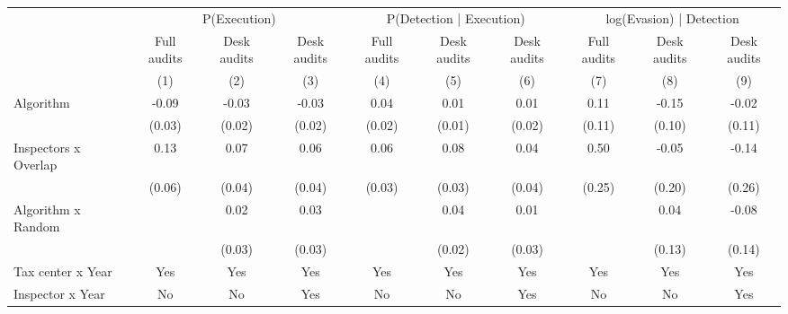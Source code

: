\begin{tabular}{lccc|ccc|ccc} \toprule
\multicolumn{1}{l}{} & \multicolumn{3}{c}{P(Execution)} & \multicolumn{3}{c}{P(Detection | Execution)} & \multicolumn{3}{c}{log(Evasion) | Detection} \\\cmidrule(lr){2-4}\cmidrule(lr){5-7}\cmidrule(lr){8-10} \multicolumn{1}{l}{} & Full audits & Desk audits & Desk audits & Full audits & Desk audits & Desk audits & Full audits & Desk audits & Desk audits \\ \multicolumn{1}{l}{} & (1) & (2) & (3) & (4) & (5) & (6) & (7) & (8) & (9) \\ \midrule
Algorithm   &       -0.09\sym{***}&       -0.03\sym{*}  &       -0.03\sym{*}  &        0.04\sym{**} &        0.01         &        0.01         &        0.11         &       -0.15         &       -0.02         \\
            &      (0.03)         &      (0.02)         &      (0.02)         &      (0.02)         &      (0.01)         &      (0.02)         &      (0.11)         &      (0.10)         &      (0.11)         \\
\addlinespace
Inspectors x Overlap&        0.13\sym{**} &        0.07\sym{*}  &        0.06         &        0.06\sym{*}  &        0.08\sym{**} &        0.04         &        0.50\sym{**} &       -0.05         &       -0.14         \\
            &      (0.06)         &      (0.04)         &      (0.04)         &      (0.03)         &      (0.03)         &      (0.04)         &      (0.25)         &      (0.20)         &      (0.26)         \\
\addlinespace
Algorithm x Random&                     &        0.02         &        0.03         &                     &        0.04\sym{*}  &        0.01         &                     &        0.04         &       -0.08         \\
            &                     &      (0.03)         &      (0.03)         &                     &      (0.02)         &      (0.03)         &                     &      (0.13)         &      (0.14)         \\
\midrule
Tax center x Year&         Yes         &         Yes         &         Yes         &         Yes         &         Yes         &         Yes         &         Yes         &         Yes         &         Yes         \\
Inspector x Year&          No         &          No         &         Yes         &          No         &          No         &         Yes         &          No         &          No         &         Yes         \\

\end{tabular}

